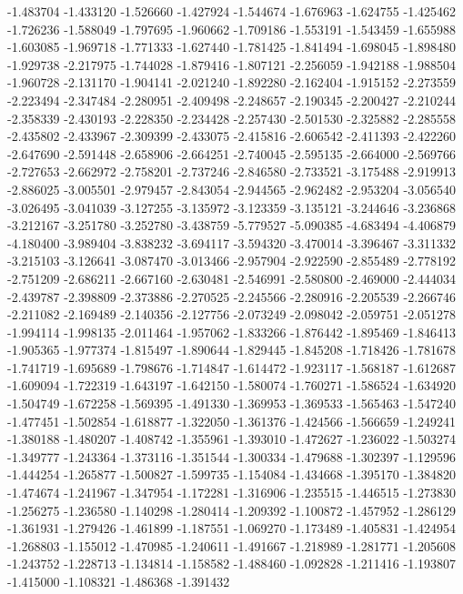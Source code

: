 -1.483704
-1.433120
-1.526660
-1.427924
-1.544674
-1.676963
-1.624755
-1.425462
-1.726236
-1.588049
-1.797695
-1.960662
-1.709186
-1.553191
-1.543459
-1.655988
-1.603085
-1.969718
-1.771333
-1.627440
-1.781425
-1.841494
-1.698045
-1.898480
-1.929738
-2.217975
-1.744028
-1.879416
-1.807121
-2.256059
-1.942188
-1.988504
-1.960728
-2.131170
-1.904141
-2.021240
-1.892280
-2.162404
-1.915152
-2.273559
-2.223494
-2.347484
-2.280951
-2.409498
-2.248657
-2.190345
-2.200427
-2.210244
-2.358339
-2.430193
-2.228350
-2.234428
-2.257430
-2.501530
-2.325882
-2.285558
-2.435802
-2.433967
-2.309399
-2.433075
-2.415816
-2.606542
-2.411393
-2.422260
-2.647690
-2.591448
-2.658906
-2.664251
-2.740045
-2.595135
-2.664000
-2.569766
-2.727653
-2.662972
-2.758201
-2.737246
-2.846580
-2.733521
-3.175488
-2.919913
-2.886025
-3.005501
-2.979457
-2.843054
-2.944565
-2.962482
-2.953204
-3.056540
-3.026495
-3.041039
-3.127255
-3.135972
-3.123359
-3.135121
-3.244646
-3.236868
-3.212167
-3.251780
-3.252780
-3.438759
-5.779527
-5.090385
-4.683494
-4.406879
-4.180400
-3.989404
-3.838232
-3.694117
-3.594320
-3.470014
-3.396467
-3.311332
-3.215103
-3.126641
-3.087470
-3.013466
-2.957904
-2.922590
-2.855489
-2.778192
-2.751209
-2.686211
-2.667160
-2.630481
-2.546991
-2.580800
-2.469000
-2.444034
-2.439787
-2.398809
-2.373886
-2.270525
-2.245566
-2.280916
-2.205539
-2.266746
-2.211082
-2.169489
-2.140356
-2.127756
-2.073249
-2.098042
-2.059751
-2.051278
-1.994114
-1.998135
-2.011464
-1.957062
-1.833266
-1.876442
-1.895469
-1.846413
-1.905365
-1.977374
-1.815497
-1.890644
-1.829445
-1.845208
-1.718426
-1.781678
-1.741719
-1.695689
-1.798676
-1.714847
-1.614472
-1.923117
-1.568187
-1.612687
-1.609094
-1.722319
-1.643197
-1.642150
-1.580074
-1.760271
-1.586524
-1.634920
-1.504749
-1.672258
-1.569395
-1.491330
-1.369953
-1.369533
-1.565463
-1.547240
-1.477451
-1.502854
-1.618877
-1.322050
-1.361376
-1.424566
-1.566659
-1.249241
-1.380188
-1.480207
-1.408742
-1.355961
-1.393010
-1.472627
-1.236022
-1.503274
-1.349777
-1.243364
-1.373116
-1.351544
-1.300334
-1.479688
-1.302397
-1.129596
-1.444254
-1.265877
-1.500827
-1.599735
-1.154084
-1.434668
-1.395170
-1.384820
-1.474674
-1.241967
-1.347954
-1.172281
-1.316906
-1.235515
-1.446515
-1.273830
-1.256275
-1.236580
-1.140298
-1.280414
-1.209392
-1.100872
-1.457952
-1.286129
-1.361931
-1.279426
-1.461899
-1.187551
-1.069270
-1.173489
-1.405831
-1.424954
-1.268803
-1.155012
-1.470985
-1.240611
-1.491667
-1.218989
-1.281771
-1.205608
-1.243752
-1.228713
-1.134814
-1.158582
-1.488460
-1.092828
-1.211416
-1.193807
-1.415000
-1.108321
-1.486368
-1.391432
